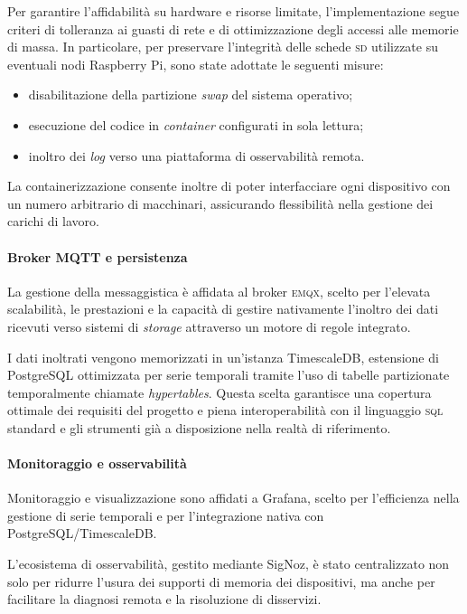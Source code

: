 \documentclass[12pt]{article}
\begin{document}
    Per garantire l'affidabilità su hardware e risorse limitate, l'implementazione segue criteri di tolleranza ai guasti di rete e di ottimizzazione degli accessi alle memorie di massa. In particolare, per preservare l'integrità delle schede \textsc{sd} utilizzate su eventuali nodi Raspberry Pi, sono state adottate le seguenti misure:
    \begin{itemize}
        \item disabilitazione della partizione \textit{swap} del sistema operativo;
        \item esecuzione del codice in \textit{container} configurati in sola lettura;
        \item inoltro dei \textit{log} verso una piattaforma di osservabilità remota.
    \end{itemize}

    La containerizzazione consente inoltre di poter interfacciare ogni dispositivo con un numero arbitrario di macchinari, assicurando flessibilità nella gestione dei carichi di lavoro.

    \paragraph{Broker MQTT e persistenza}

    La gestione della messaggistica è affidata al broker \textsc{emqx}, scelto per l'elevata scalabilità, le prestazioni e la capacità di gestire nativamente l'inoltro dei dati ricevuti verso sistemi di \textit{storage} attraverso un motore di regole integrato.

    I dati inoltrati vengono memorizzati in un'istanza TimescaleDB, estensione di PostgreSQL ottimizzata per serie temporali tramite l'uso di tabelle partizionate temporalmente chiamate \textit{hypertables}. Questa scelta garantisce una copertura ottimale dei requisiti del progetto e piena interoperabilità con il linguaggio \textsc{sql} standard e gli strumenti già a disposizione nella realtà di riferimento. 

    \paragraph{Monitoraggio e osservabilità}
    Monitoraggio e visualizzazione sono affidati a Grafana, scelto per l'efficienza nella gestione di serie temporali e per l'integrazione nativa con PostgreSQL/TimescaleDB.

    L'ecosistema di osservabilità, gestito mediante SigNoz, è stato centralizzato non solo per ridurre l'usura dei supporti di memoria dei dispositivi, ma anche per facilitare la diagnosi remota e la risoluzione di disservizi.
    
\end{document}
